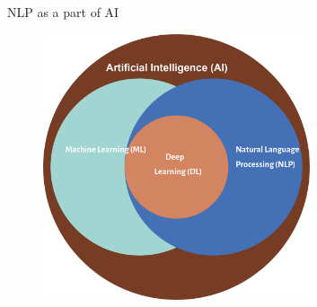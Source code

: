 \documentclass{beamer}
\begin{document}
\begin{frame}{NLP as a part of AI}{}
    \begin{figure}
        \centering
        \includegraphics[width=0.7\textwidth,keepaspectratio]{images/nlp_diagram}
        \label{fig:nlp_diagram}
    \end{figure}
\end{frame}
\end{document}
